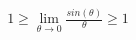 \documentclass[preview]{standalone}
\begin{document}
\begin{align*}
1 \geq \lim_{\theta\to0}\frac{sin(\theta)}{\theta} \geq 1
\end{align*}
\end{document}
